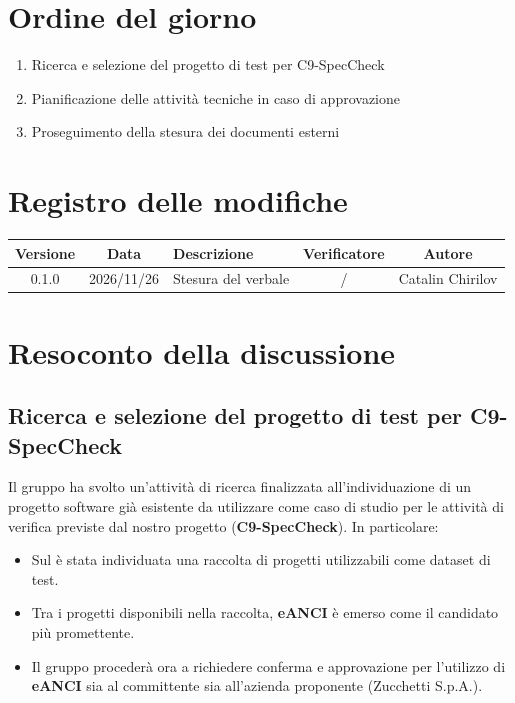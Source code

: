 \documentclass[a4paper, 11pt]{article}
\begin{document}
\section*{Ordine del giorno}
\begin{enumerate}
    \item Ricerca e selezione del progetto di test per C9-SpecCheck\vspace{-0.2cm}
    \item Pianificazione delle attività tecniche in caso di approvazione\vspace{-0.2cm}
    \item Proseguimento della stesura dei documenti esterni
\end{enumerate}
\vspace{-0.5cm}

\section*{Registro delle modifiche}
\begin{tabularx}{\textwidth}{|c|c|X|c|c|}
    \hline
    \textbf{Versione} & \textbf{Data} & \textbf{Descrizione} & \textbf{Verificatore} & \textbf{Autore} \\ \hline
    0.1.0 & 2026/11/26 & Stesura del verbale  & / & Catalin Chirilov \\ \hline
\end{tabularx}

\newpage
\tableofcontents
\newpage


\section{Resoconto della discussione}

\subsection{Ricerca e selezione del progetto di test per C9-SpecCheck}
Il gruppo ha svolto un'attività di ricerca finalizzata all'individuazione di un progetto software già esistente da utilizzare come caso di studio per le attività di verifica previste dal nostro progetto (\textbf{C9-SpecCheck}). In particolare:
\begin{itemize}
    \item Sul  è stata individuata una raccolta di progetti utilizzabili come dataset di test.\vspace{-0.2cm}
    \item Tra i progetti disponibili nella raccolta, \textbf{eANCI} è emerso come il candidato più promettente.\vspace{-0.2cm}
    \item Il gruppo procederà ora a richiedere conferma e approvazione per l'utilizzo di \textbf{eANCI} sia al committente sia all'azienda proponente (Zucchetti S.p.A.).
\end{itemize}
\end{document}
